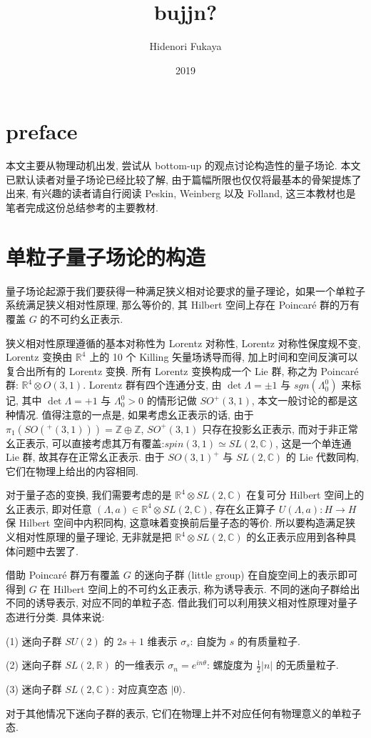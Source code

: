 \documentclass{article}
\title{\textbf{bujjn?}}
\author{Hidenori Fukaya}
\date{2019}
\begin{document}
\CJKspace
\newpage
{}
\newpage
{}
\maketitle


\section{preface}
本文主要从物理动机出发, 尝试从 bottom-up 的观点讨论构造性的量子场论. 本文已默认读者对量子场论已经比较了解, 由于篇幅所限也仅仅将最基本的骨架提炼了出来, 有兴趣的读者请自行阅读 Peskin, Weinberg 以及 Folland, 这三本教材也是笔者完成这份总结参考的主要教材.
\section{单粒子量子场论的构造}
量子场论起源于我们要获得一种满足狭义相对论要求的量子理论，如果一个单粒子系统满足狭义相对性原理, 那么等价的, 其 Hilbert 空间上存在 Poincar\'{e} 群的万有覆盖 $G$ 的不可约幺正表示.
\par
狭义相对性原理遵循的基本对称性为 Lorentz 对称性, Lorentz 对称性保度规不变, Lorentz 变换由 $\mathbb{R}^{4}$ 上的 10 个 Killing 矢量场诱导而得, 加上时间和空间反演可以复合出所有的 Lorentz 变换. 所有 Lorentz 变换构成一个 Lie 群, 称之为 Poincar\'{e} 群: $\mathbb{R}^{4}\otimes O(3,1)$. Lorentz 群有四个连通分支, 由 $\det{\Lambda}=\pm1$ 与 $sgn(\Lambda_{0}^{0})$ 来标记, 其中 $\det{\Lambda}=+1$ 与 $\Lambda_{0}^{0}>0$ 的情形记做 $SO^{+}(3,1)$, 本文一般讨论的都是这种情况. 值得注意的一点是, 如果考虑幺正表示的话, 由于 $\pi_{1}(SO(^{+}(3,1)))=\mathbb{Z}\oplus \mathbb{Z}$, $SO^{+}(3,1)$ 只存在投影幺正表示, 而对于非正常幺正表示, 可以直接考虑其万有覆盖:$spin(3,1)\simeq SL(2,\mathbb{C})$, 这是一个单连通 Lie 群, 故其存在正常幺正表示. 由于 $SO(3,1)^{+}$ 与 $SL(2,\mathbb{C})$ 的 Lie 代数同构, 它们在物理上给出的内容相同.
\par
对于量子态的变换, 我们需要考虑的是 $\mathbb{R}^{4}\otimes SL(2,\mathbb{C})$ 在复可分 Hilbert 空间上的幺正表示, 即对任意 $(\Lambda,a)\in\mathbb{R}^{4}\otimes SL(2,\mathbb{C})$, 存在幺正算子 $U(\Lambda,a):H\rightarrow H$ 保 Hilbert 空间中内积同构, 这意味着变换前后量子态的等价. 所以要构造满足狭义相对性原理的量子理论, 无非就是把 $\mathbb{R}^{4}\otimes SL(2,\mathbb{C})$ 的幺正表示应用到各种具体问题中去罢了.
\par
借助 Poincar\'{e} 群万有覆盖 $G$ 的迷向子群 (little group) 在自旋空间上的表示即可得到 $G$ 在 Hilbert 空间上的不可约幺正表示, 称为诱导表示. 不同的迷向子群给出不同的诱导表示, 对应不同的单粒子态. 借此我们可以利用狭义相对性原理对量子态进行分类. 具体来说:
\par
(1) 迷向子群 $SU(2)$ 的 $2s+1$ 维表示 $\sigma_{s}$: 自旋为 $s$ 的有质量粒子.
\par
(2) 迷向子群 $SL(2,\mathbb{R})$ 的一维表示 $\sigma_{n}=e^{in\theta}$: 螺旋度为 $\frac{1}{2}|n|$ 的无质量粒子.
\par
(3) 迷向子群 $SL(2,\mathbb{C})$: 对应真空态 $|0\rangle$.
\par
对于其他情况下迷向子群的表示, 它们在物理上并不对应任何有物理意义的单粒子态.
\end{document}
